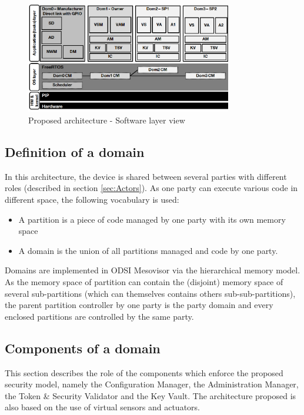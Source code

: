 \documentclass[conference]{IEEEtran}
\begin{document}
\begin{figure}[h!]
\centering
\includegraphics[width=9cm]{figures/soft_layer.png}
\caption{Proposed architecture - Software layer view}
\label{fig:Arch_soft}
\end{figure}

\subsection{Definition of a domain}
\label{sec:Domain_def}
In this architecture, the device is shared between several parties with different roles (described in section \ref{sec:Actors}). As one party can execute various code in different space, the following vocabulary is used:
\begin{itemize}
    \item A partition is a piece of code managed by one party with its own memory space
    \item A domain is the union of all partitions managed and code by one party.
\end{itemize}
Domains are implemented in ODSI Mesovisor via the hierarchical memory model. As the memory space of partition can contain the (disjoint) memory space of several sub-partitions (which can themselves contains others sub-sub-partitions), the parent partition controller by one party is the party domain and every enclosed partitions are controlled by the same party.


\subsection{Components of a domain}
\label{sec:Domain_comp}
This section describes the role of the components which enforce the proposed security model, namely the Configuration Manager, the Administration Manager, the Token \& Security Validator and the Key Vault. The architecture proposed is also based on the use of virtual sensors and actuators. 
\end{document}
